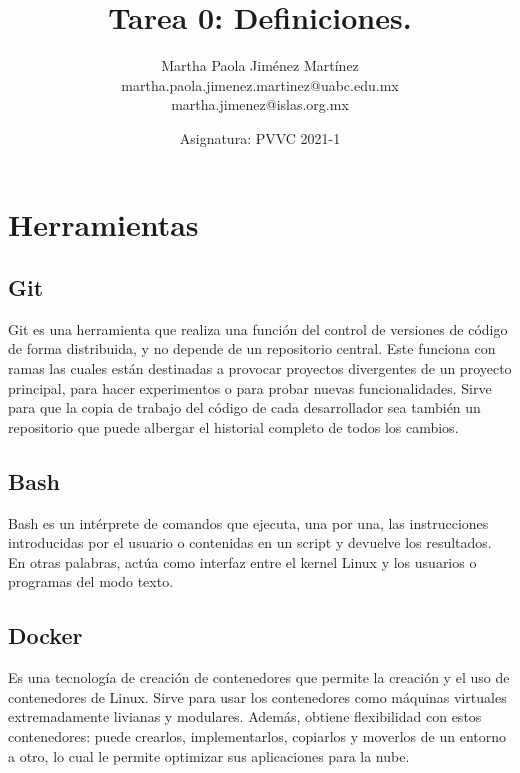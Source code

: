\documentclass[12pt,letterpaper]{article}
\begin{document}
\title{\textbf{Tarea 0: 
Definiciones.}}
\author{Martha Paola Jim\'enez Mart\'inez \\
\small{martha.paola.jimenez.martinez@uabc.edu.mx} \\
\small{martha.jimenez@islas.org.mx}}
\date{ \small{Asignatura: PVVC 2021-1}
} 
\maketitle

\section*{Herramientas}
\subsection*{Git}
Git es una herramienta que realiza una funci\'on del control de versiones de c\'odigo de forma distribuida, y no depende de un repositorio central.
Este funciona con ramas las cuales est\'an destinadas a provocar proyectos divergentes de un proyecto principal, para hacer experimentos o para probar nuevas funcionalidades.
\citep{GitRubio}
Sirve para que la copia de trabajo del c\'odigo de cada desarrollador sea tambi\'en un repositorio que puede albergar el historial completo de todos los cambios.
\citep{BitAtlas}

\subsection*{Bash}
Bash es un int\'erprete de comandos que ejecuta, una por una, las instrucciones introducidas por el usuario o contenidas en un script y devuelve los resultados. En otras palabras, act\'ua como interfaz entre el kernel Linux y los usuarios o programas del modo texto.
\citep{CanBlog}

\subsection*{Docker}
Es una tecnolog\'ia de creación de contenedores que permite la creaci\'on y el uso de contenedores de Linux.
Sirve para usar los contenedores como m\'aquinas virtuales extremadamente livianas y modulares. Adem\'as, obtiene flexibilidad con estos contenedores: puede crearlos, implementarlos, copiarlos y moverlos de un entorno a otro, lo cual le permite optimizar sus aplicaciones para la nube.
\citep{RedDocker}
\end{document}
